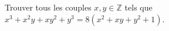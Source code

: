 Trouver tous les couples $x, y \in \mathbb{Z}$ tels que $x^3 + x^2y + xy^2 + y^3 = 8(x^2 + xy + y^2 + 1)$.
